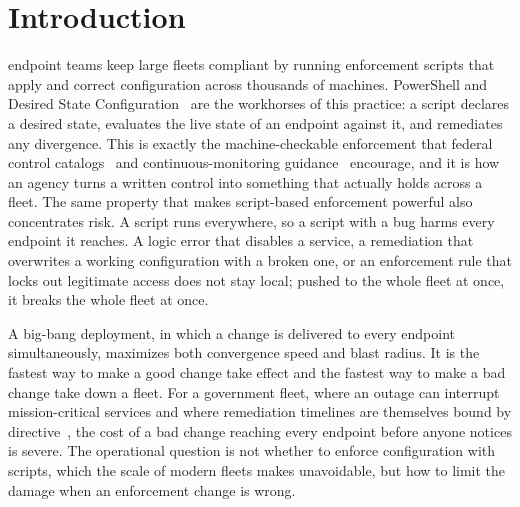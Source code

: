 \documentclass[journal]{IEEEtran}
\begin{document}

\section{Introduction}
 endpoint teams keep large fleets compliant by running enforcement
scripts that apply and correct configuration across thousands of machines. PowerShell and Desired
State Configuration~\cite{powershelldsc} are the workhorses of this practice: a script declares a
desired state, evaluates the live state of an endpoint against it, and remediates any divergence.
This is exactly the machine-checkable enforcement that federal control catalogs~\cite{nist80053} and
continuous-monitoring guidance~\cite{nist80137} encourage, and it is how an agency turns a written
control into something that actually holds across a fleet. The same property that makes script-based
enforcement powerful also concentrates risk. A script runs everywhere, so a script with a bug harms
every endpoint it reaches. A logic error that disables a service, a remediation that overwrites a
working configuration with a broken one, or an enforcement rule that locks out legitimate access
does not stay local; pushed to the whole fleet at once, it breaks the whole fleet at once.

A big-bang deployment, in which a change is delivered to every endpoint simultaneously, maximizes
both convergence speed and blast radius. It is the fastest way to make a good change take effect and
the fastest way to make a bad change take down a fleet. For a government fleet, where an outage can
interrupt mission-critical services and where remediation timelines are themselves bound by
directive~\cite{cisabod2201}, the cost of a bad change reaching every endpoint before anyone notices
is severe. The operational question is not whether to enforce configuration with scripts, which the
scale of modern fleets makes unavoidable, but how to limit the damage when an enforcement change is
wrong.
\end{document}
